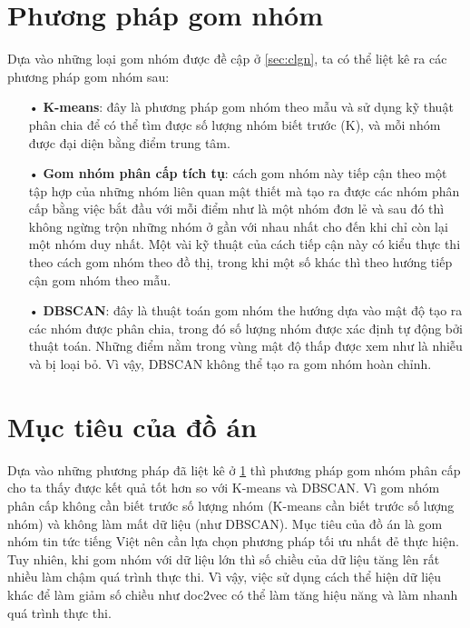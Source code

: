 \section{Phương pháp gom nhóm}
\label{sec:ppgn}
Dựa vào những loại gom nhóm được đề cập ở \ref{sec:clgn}, ta có thể liệt kê ra các phương pháp gom nhóm sau:
\begin{enumerate}
\item[•]\textbf{K-means}: đây là phương pháp gom nhóm theo mẫu và sử dụng kỹ thuật phân chia để có thể tìm được số lượng nhóm biết trước (K), và mỗi nhóm được đại diện bằng điểm trung tâm.
\item[•]\textbf{Gom nhóm phân cấp tích tụ}: cách gom nhóm này tiếp cận theo một tập hợp của những nhóm liên quan mật thiết mà tạo ra được các nhóm phân cấp bằng việc bắt đầu với mỗi điểm như là một nhóm đơn lẻ và sau đó thì không ngừng trộn những nhóm ở gần với nhau nhất cho đến khi chỉ còn lại một nhóm duy nhất.
Một vài kỹ thuật của cách tiếp cận này có kiểu thực thi theo cách gom nhóm theo đồ thị, trong khi một số khác thì theo hướng tiếp cận gom nhóm theo mẫu.
\item[•]\textbf{DBSCAN}: đây là thuật toán gom nhóm the hướng dựa vào mật độ tạo ra các nhóm được phân chia, trong đó số lượng nhóm được xác định tự động bởi thuật toán.
Những điểm nằm trong vùng mật độ thấp được xem như là nhiễu và bị loại bỏ.
Vì vậy, DBSCAN không thể tạo ra gom nhóm hoàn chỉnh.
\end{enumerate}

\section{Mục tiêu của đồ án}
Dựa vào những phương pháp đã liệt kê ở \ref{sec:ppgn} thì phương pháp gom nhóm phân cấp cho ta thấy được kết quả tốt hơn so với K-means và DBSCAN.
Vì gom nhóm phân cấp không cần biết trước số lượng nhóm (K-means cần biết trước số lượng nhóm) và không làm mất dữ liệu (như DBSCAN).
Mục tiêu của đồ án là gom nhóm tin tức tiếng Việt nên cần lựa chọn phương pháp tối ưu nhất đẻ thực hiện.
Tuy nhiên, khi gom nhóm với dữ liệu lớn thì số chiều của dữ liệu tăng lên rất nhiều làm chậm quá trình thực thi.
Vì vậy, việc sử dụng cách thể hiện dữ liệu khác để làm giảm số chiều như doc2vec có thể làm tăng hiệu năng và làm nhanh quá trình thực thi.
